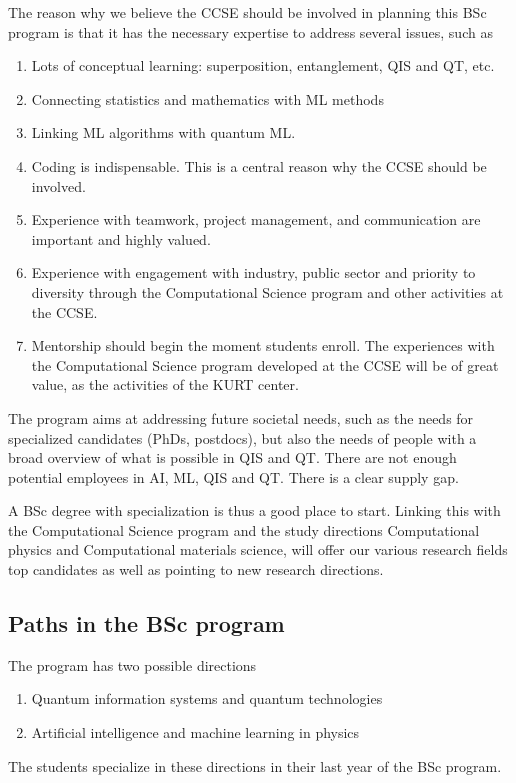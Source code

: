 \documentclass[aps,rmp,preprint,amsmath,amssymb,graphicx,longbibliography]{revtex4-1}
\begin{document}
The reason why we believe the CCSE should be involved in planning this BSc program is that it has the necessary expertise to address several issues, such as
\begin{enumerate}
    \item  Lots of conceptual learning: superposition, entanglement, QIS and QT, etc. 
    \item Connecting statistics and mathematics with ML methods
    \item Linking ML algorithms with quantum ML.
\item Coding is indispensable. This is a central reason why the CCSE should be involved.
\item Experience with teamwork, project management, and communication are important and highly valued.
\item  Experience with engagement with industry, public sector and priority to diversity through the Computational Science program and other activities at the CCSE.
\item  Mentorship should begin the moment students enroll. The experiences with the Computational Science program developed at the CCSE will be of great value, as the activities of the KURT center.
\end{enumerate}

The program aims at addressing future societal needs, such as the  needs for specialized candidates (PhDs, postdocs), but also the needs of  people with a broad overview of what is possible in  QIS and QT. There are  not enough potential employees in AI, ML, QIS and QT. There is  a clear supply gap.

A BSc degree  with specialization  is thus a good place to start. Linking this with the Computational Science program and the study directions Computational physics and Computational materials science, will offer our various research fields top candidates as well as pointing to new research directions. 

\subsection{Paths in the BSc program}

The program has two possible directions
\begin{enumerate}
    \item Quantum information systems and quantum technologies
    \item Artificial intelligence and machine learning in physics
\end{enumerate}
The students specialize in these directions in their last year of the BSc program.
\end{document}
